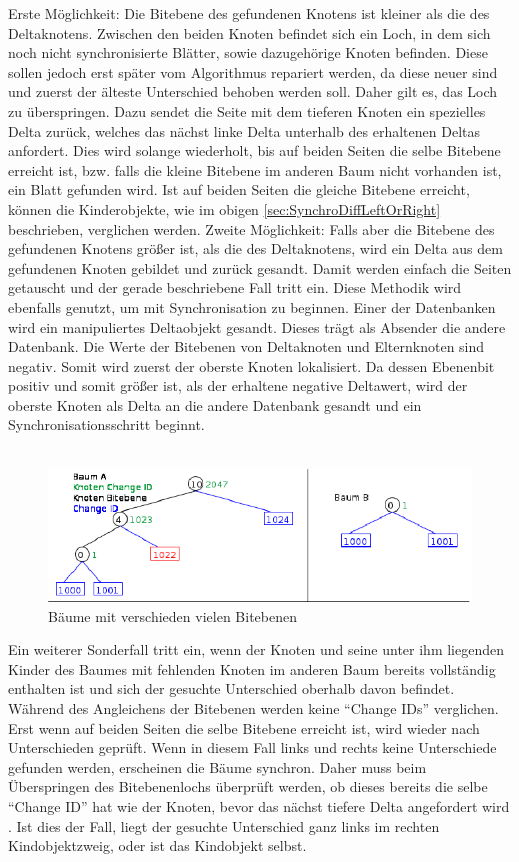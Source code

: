 \documentclass[a4paper,11pt,oneside,%
headsepline,												%
footsepline,												%
bibtotocnumbered									%
]{scrreprt}
\begin{document}
Erste Möglichkeit: Die Bitebene des gefundenen Knotens ist kleiner als die des Deltaknotens. Zwischen den beiden Knoten befindet sich ein Loch, in dem sich noch nicht synchronisierte Blätter, sowie dazugehörige Knoten befinden. Diese sollen jedoch erst später vom Algorithmus repariert werden, da diese neuer sind und zuerst der älteste Unterschied behoben werden soll. Daher gilt es, das Loch zu überspringen. Dazu sendet die Seite mit dem tieferen Knoten ein spezielles Delta zurück, welches das nächst linke Delta unterhalb des erhaltenen Deltas anfordert. Dies wird solange wiederholt, bis auf beiden Seiten die selbe Bitebene erreicht ist, bzw. falls die kleine Bitebene im anderen Baum nicht vorhanden ist, ein Blatt gefunden wird. Ist auf beiden Seiten die gleiche Bitebene erreicht, können die Kinderobjekte, wie im obigen \autoref{sec:SynchroDiffLeftOrRight} beschrieben, verglichen werden.
Zweite Möglichkeit: Falls aber die Bitebene des gefundenen Knotens größer ist, als die des Deltaknotens, wird ein Delta aus dem gefundenen Knoten gebildet und zurück gesandt. Damit werden einfach die Seiten getauscht und der gerade beschriebene Fall tritt ein. Diese Methodik wird ebenfalls genutzt, um mit Synchronisation zu beginnen. Einer der Datenbanken wird ein manipuliertes Deltaobjekt gesandt. Dieses trägt als Absender die andere Datenbank. Die Werte der Bitebenen von Deltaknoten und Elternknoten sind negativ. Somit wird zuerst der oberste Knoten lokalisiert. Da dessen Ebenenbit positiv und somit größer ist, als der erhaltene negative Deltawert, wird der oberste Knoten als Delta an die andere Datenbank gesandt und ein Synchronisationsschritt beginnt. \\\\
\begin{figure}[h!]
  \begin{center}
    \includegraphics[width=0.9\linewidth]{bilder/case 2 A B1.png}
  \end{center}
 \caption{Bäume mit verschieden vielen Bitebenen}
\end{figure}
Ein weiterer Sonderfall tritt ein, wenn der Knoten und seine unter ihm liegenden Kinder des Baumes mit fehlenden Knoten im anderen Baum bereits vollständig enthalten ist und sich der gesuchte Unterschied oberhalb davon befindet. Während des Angleichens der Bitebenen werden keine \enquote{Change IDs} verglichen. Erst wenn auf beiden Seiten die selbe Bitebene erreicht ist, wird wieder nach Unterschieden geprüft. Wenn in diesem Fall links und rechts keine Unterschiede gefunden werden, erscheinen die Bäume synchron. Daher muss beim Überspringen des Bitebenenlochs überprüft werden, ob dieses bereits die selbe \enquote{Change ID}  hat wie der Knoten, bevor das nächst tiefere Delta angefordert wird . Ist dies der Fall, liegt der gesuchte Unterschied ganz links im rechten Kindobjektzweig, oder ist das Kindobjekt selbst.
\end{document}
